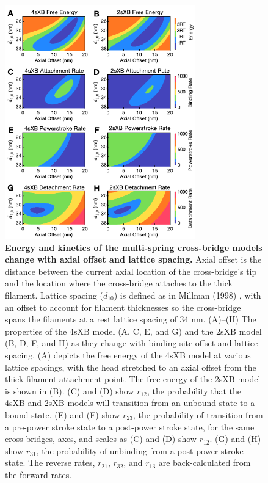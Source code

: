\documentclass[10pt]{article}
\newcommand{\citep}[1]{\cite{#1}} %
\begin{document}
\clearpage
\begin{figure}[ht]
    \begin{center}
    \includegraphics[width=3.25in]{../imgs/Figure2.pdf}
    \caption{ \textbf{Energy and kinetics of the multi-spring cross-bridge models change with axial offset and lattice spacing.} 
        Axial offset is the distance between the current axial location of the cross-bridge's tip and the location where the cross-bridge attaches to the thick filament.  
        Lattice spacing ($d_{10}$) is defined as in Millman (1998) \protect\citep{Millman1998}, with an offset to account for filament thicknesses so the cross-bridge spans the filaments at a rest lattice spacing of 34 nm. 
        (A)--(H)  The properties of the 4sXB model (A, C, E, and G) and the 2sXB model (B, D, F, and H) as they change with binding site offset and lattice spacing.
        (A) depicts the free energy of the 4sXB model at various lattice spacings, with the head stretched to an axial offset from the thick filament attachment point.
        The free energy of the 2sXB model is shown in (B).  
        (C) and (D) show $r_{12}$, the probability that the 4sXB and 2sXB models will transition from an unbound state to a bound state. 
        (E) and (F) show $r_{23}$, the probability of transition from a pre-power stroke state to a post-power stroke state, for the same cross-bridges, axes, and scales as (C) and (D) show $r_{12}$.
        (G) and (H) show $r_{31}$, the probability of unbinding from a post-power stroke state. 
        The reverse rates, $r_{21}$, $r_{32}$, and $r_{13}$ are back-calculated from the forward rates.
        \label{fig_kinetics_contours}
        }
    \end{center}
\end{figure}
\end{document}
